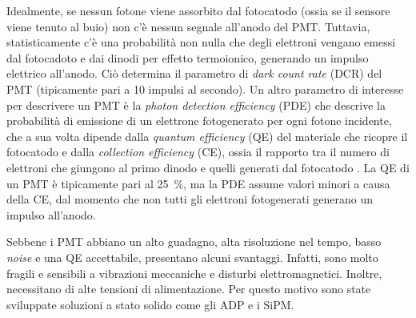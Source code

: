 Idealmente, se nessun fotone viene assorbito dal fotocatodo (ossia se il sensore viene tenuto al buio) non c'è nessun segnale all'anodo del PMT. Tuttavia, statisticamente c'è una probabilità non nulla che degli elettroni vengano emessi dal fotocadoto e dai dinodi per effetto termoionico, generando un impulso elettrico all'anodo. Ciò determina il parametro di \textit{dark count rate} (DCR) del PMT (tipicamente pari a 10 impulsi al secondo).
Un altro parametro di interesse per descrivere un PMT è la \textit{photon detection efficiency} (PDE) che descrive la probabilità di emissione di un elettrone fotogenerato per ogni fotone incidente, che a sua volta dipende dalla \textit{quantum efficiency} (QE) del materiale che ricopre il fotocatodo e dalla \textit{collection efficiency} (CE), ossia il rapporto tra il numero di elettroni che giungono al primo dinodo e quelli generati dal fotocatodo \cite{Hai2018}. La QE di un PMT è tipicamente pari al \SI{25}{\percent}, ma la PDE assume valori minori a causa della CE, dal momento che non tutti gli elettroni fotogenerati generano un impulso all'anodo.

Sebbene i PMT abbiano un alto guadagno, alta risoluzione nel tempo, basso \textit{noise} e una QE accettabile, presentano alcuni svantaggi. Infatti, sono molto fragili e sensibili a vibrazioni meccaniche e disturbi elettromagnetici. Inoltre, necessitano di alte tensioni di alimentazione. Per questo motivo sono state sviluppate soluzioni a stato solido come gli ADP e i SiPM.

